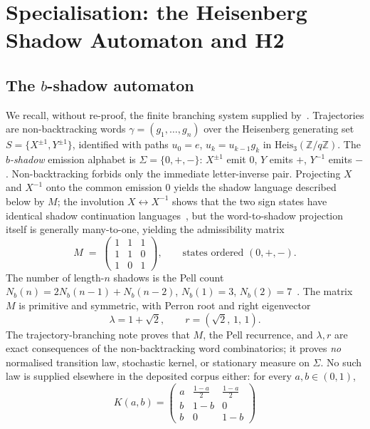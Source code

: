 \documentclass[11pt,a4paper]{article}
\theoremstyle{definition}
\theoremstyle{remark}
\newcommand{\Z}{\mathbb{Z}}
\newcommand{\Heis}{\mathrm{Heis}_3(\Z/q\Z)}
\newcommand{\Sh}{\Sigma}
\begin{document}
\section{Specialisation: the Heisenberg Shadow Automaton and \textup{H2}}
\label{sec:h2}

\subsection{The $b$-shadow automaton}
\label{sec:automaton}

We recall, without re-proof, the finite branching system supplied
by~\cite{Beau2026tb}. Trajectories are non-backtracking words
$\gamma=(g_1,\dots,g_n)$ over the Heisenberg generating set
$S=\{X^{\pm1},Y^{\pm1}\}$, identified with paths $u_0=e$, $u_k=u_{k-1}g_k$ in
$\Heis$. The \emph{$b$-shadow} emission alphabet is $\Sh=\{0,+,-\}$: $X^{\pm1}$ emit
$0$, $Y$ emits $+$, $Y^{-1}$ emits $-$. Non-backtracking forbids only the immediate
letter-inverse pair. Projecting $X$ and $X^{-1}$ onto the common emission $0$ yields the
shadow language described below by $M$; the involution $X\leftrightarrow X^{-1}$ shows
that the two sign states have identical shadow continuation
languages~\cite{Beau2026tb}, but the word-to-shadow projection itself is generally
many-to-one, yielding the admissibility matrix
\begin{equation}
  \label{eq:M}
  M \;=\; \begin{pmatrix} 1&1&1\\ 1&1&0\\ 1&0&1 \end{pmatrix},
  \qquad \text{states ordered } (0,+,-).
\end{equation}
The number of length-$n$ shadows is the Pell count $N_b(n)=2N_b(n-1)+N_b(n-2)$,
$N_b(1)=3$, $N_b(2)=7$~\cite{Beau2026tb}. The matrix $M$ is primitive and symmetric,
with Perron root and right eigenvector
\begin{equation}
  \label{eq:perron}
  \lambda = 1+\sqrt2, \qquad r = (\sqrt2,\,1,\,1).
\end{equation}
The trajectory-branching note proves that $M$, the Pell recurrence, and $\lambda,r$ are
exact consequences of the non-backtracking word combinatorics; it proves \emph{no}
normalised transition law, stochastic kernel, or stationary measure on $\Sh$. No such
law is supplied elsewhere in the deposited corpus either: for every $a,b\in(0,1)$,
\begin{equation}
  \label{eq:counterfamily}
  K(a,b) = \begin{pmatrix} a & \tfrac{1-a}{2} & \tfrac{1-a}{2} \\ b & 1-b & 0 \\ b & 0 & 1-b \end{pmatrix}
\end{equation}
\end{document}
